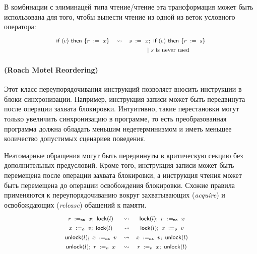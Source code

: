 В комбинации с элиминацей типа чтение/чтение 
эта трансформация может быть использована 
для того, чтобы вынести чтение из 
одной из веток условного оператора:
%
\[\def\arraystretch{1.4}\footnotesize
  \begin{array}{ccc} 

      \kw{if} (e)~ \kw{then} \{ \readInst{}{r}{x} \}
    & \leadsto 
    & \readInst{}{s}{x} \seq \kw{if} (e)~ \kw{then} \{ \assignInst{r}{s} \} \\
    & & ~|~ \text{$s$ is never used}  \\ 

  \end{array}
\]

\paragraph{
(Roach Motel Reordering)
}

Этот класс переупорядочивания инструкций позволяет 
вносить инструкции в блоки синхронизации. 
Например, инструкция записи может быть передвинута 
после операции захвата блокировки. 
Интуитивно, такие перестановки могут 
только увеличить синхронизацию в программе, 
то есть преобразованная программа 
должна обладать меньшим недетерминизмом 
и иметь меньшее количество допустимых сценариев поведения. 

Неатомарные обращения могут быть передвинуты 
в критическую секцию без дополнительных предусловий. 
Кроме того, инструкция записи может быть перемещена после 
операции захвата блокировки, а инструкция чтения 
может быть перемещена до операции освобождения блокировки. 
Схожие правила применяются к переупорядочиванию вокруг 
захватывающих (\emph{acquire}) и освобождающих (\emph{release}) 
обащений к памяти. 
\[\def\arraystretch{1.4}\footnotesize
  \begin{array}{cccl} 

      \readInst{\na}{r}{x} \seq \lockInst{l} 
    & \leadsto 
    & \lockInst{l} \seq \readInst{\na}{r}{x}
    & ~ \\ 

      \writeInst{o}{x}{v} \seq \lockInst{l} 
    & \leadsto 
    & \lockInst{l} \seq \writeInst{o}{x}{v}
    & ~  \\ 

      \unlockInst{l} \seq \writeInst{\na}{x}{v} 
    & \leadsto 
    & \writeInst{\na}{x}{v} \seq \unlockInst{l}
    & ~ \\ 


      \unlockInst{l} \seq \readInst{o}{r}{x} 
    & \leadsto 
    & \readInst{o}{r}{x} \seq \unlockInst{l}
    & ~  \\ 

  \end{array}
\]


